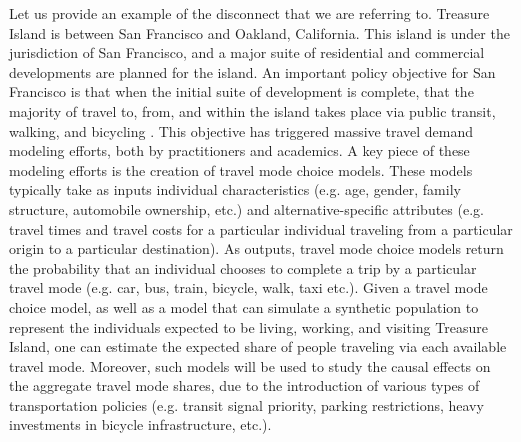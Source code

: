Let us provide an example of the disconnect that we are referring to. Treasure Island is between San Francisco and Oakland, California. This island is under the jurisdiction of San Francisco, and a major suite of residential and commercial developments are planned for the island. An important policy objective for San Francisco is that when the initial suite of development is complete, that the majority of travel to, from, and within the island takes place via public transit, walking, and bicycling \citep{treasure2015mobility}. This objective has triggered massive travel demand modeling efforts, both by practitioners and academics. A key piece of these modeling efforts is the creation of travel mode choice models. These models typically take as inputs individual characteristics (e.g. age, gender, family structure, automobile ownership, etc.) and alternative-specific attributes (e.g. travel times and travel costs for a particular individual traveling from a particular origin to a particular destination). As outputs, travel mode choice models return the probability that an individual chooses to complete a trip by a particular travel mode (e.g. car, bus, train, bicycle, walk, taxi etc.). Given a travel mode choice model, as well as a model that can simulate a synthetic population to represent the individuals expected to be living, working, and visiting Treasure Island, one can estimate the expected share of people traveling via each available travel mode. Moreover, such models will be used to study the causal effects on the aggregate travel mode shares, due to the introduction of various types of transportation policies (e.g. transit signal priority, parking restrictions, heavy investments in bicycle infrastructure, etc.).

